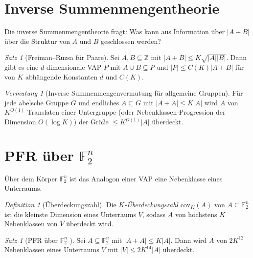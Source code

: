 \documentclass[12pt,a4paper]{amsart}
\theoremstyle{definition}
\theoremstyle{remark}
\newtheorem{satz}[theorem]{Satz}
\newtheorem{vermutung}[theorem]{Vermutung}
\newtheorem{definition_de}[theorem]{Definition}
\newcommand{\F}{\mathbb{F}}
\newcommand{\Z}{\mathbb{Z}}
\begin{document}
\section{Inverse Summenmengentheorie}\label{sec:invers}

Die inverse Summenmengentheorie fragt: Was kann aus Information über $|A + B|$ über
die Struktur von $A$ und $B$ geschlossen werden?

\begin{satz}[Freiman--Ruzsa für Paare]\label{satz:fr_paare}
Sei $A, B \subseteq \Z$ mit $|A + B| \leq K \sqrt{|A||B|}$. Dann gibt es eine
$d$-dimensionale VAP $P$ mit $A \cup B \subseteq P$ und $|P| \leq C(K)|A+B|$
für von $K$ abhängende Konstanten $d$ und $C(K)$.
\end{satz}

\begin{vermutung}[Inverse Summenmengenvermutung für allgemeine Gruppen]
\label{verm:invers_allg}
Für jede abelsche Gruppe $G$ und endliches $A \subseteq G$ mit
$|A + A| \leq K|A|$ wird $A$ von $K^{O(1)}$ Translaten einer Untergruppe
(oder Nebenklassen-Progression der Dimension $O(\log K)$) der Größe
$\leq K^{O(1)} |A|$ überdeckt.
\end{vermutung}

\section{PFR über $\F_2^n$}\label{sec:pfr_f2}

Über dem Körper $\F_2^n$ ist das Analogon einer VAP eine Nebenklasse eines
Unterraums.

\begin{definition_de}[Überdeckungszahl]
Die \emph{$K$-Überdeckungszahl} $\mathrm{cov}_K(A)$ von $A \subseteq \F_2^n$ ist
die kleinste Dimension eines Unterraums $V$, sodass $A$ von höchstens $K$ Nebenklassen
von $V$ überdeckt wird.
\end{definition_de}

\begin{satz}[PFR über $\F_2^n$ \cite{GowersTao2023}]\label{satz:pfr_f2}
Sei $A \subseteq \F_2^n$ mit $|A + A| \leq K|A|$. Dann wird $A$ von
$2K^{12}$ Nebenklassen eines Unterraums $V$ mit $|V| \leq 2K^{14}|A|$ überdeckt.
\end{satz}
\end{document}
